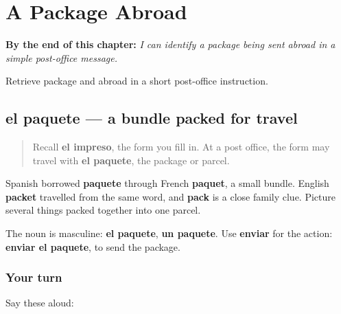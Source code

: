 
\chapter{A Package Abroad}
\label{ch:paquete-extranjero}

\begin{chapteropening}
\textbf{By the end of this chapter:} \emph{I can identify a package being sent abroad in a simple post-office message.}

Retrieve package and abroad in a short post-office instruction.
\end{chapteropening}

\section[el paquete]{el paquete — a bundle packed for travel}

\label{lesson:ES-C415-paquete}



\begin{quote}
Recall \textbf{el impreso}, the form you fill in. At a post office, the form may travel with \textbf{el paquete}, the package or parcel.
\end{quote}

\begin{cousinweb}
Spanish borrowed \textbf{paquete} through French \textbf{paquet}, a small bundle. English \textbf{packet} travelled from the same word, and \textbf{pack} is a close family clue. Picture several things packed together into one parcel.
\end{cousinweb}

\begin{grammarlens}[title={Grammar Lens: what happens to the package?}]
The noun is masculine: \textbf{el paquete}, \textbf{un paquete}. Use \textbf{enviar} for the action: \textbf{enviar el paquete}, to send the package.
\end{grammarlens}

\subsection*{Your turn}
Say these aloud:

